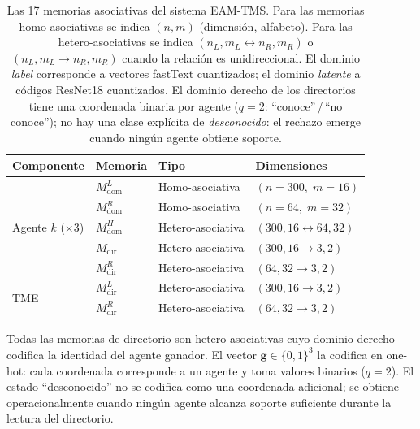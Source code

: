 \begin{table}[H]
\centering
\caption{Las 17 memorias asociativas del sistema EAM-TMS.
Para las memorias homo-asociativas se indica $(n, m)$ (dimensión, alfabeto).
Para las hetero-asociativas se indica $(n_L, m_L \leftrightarrow n_R, m_R)$ o
$(n_L, m_L \to n_R, m_R)$ cuando la relación es unidireccional.
El dominio \emph{label} corresponde a vectores fastText cuantizados;
el dominio \emph{latente} a códigos ResNet18 cuantizados.
El dominio derecho de los directorios tiene una coordenada binaria por agente
($q{=}2$: ``conoce''\,/\,``no conoce''); no hay una clase explícita de
\emph{desconocido}: el rechazo emerge cuando ningún agente obtiene soporte.}
\label{tab:memorias}
\small
\begin{tabular}{@{}llll@{}}
\toprule
\textbf{Componente} & \textbf{Memoria} & \textbf{Tipo} & \textbf{Dimensiones} \\
\midrule
\multirow{5}{*}{Agente $k$ (×3)} &
  $M^L_{\mathrm{dom}}$ & Homo-asociativa & $(n{=}300,\; m{=}16)$ \\
& $M^R_{\mathrm{dom}}$ & Homo-asociativa & $(n{=}64,\; m{=}32)$ \\
& $M^H_{\mathrm{dom}}$ & Hetero-asociativa & $(300, 16 \leftrightarrow 64, 32)$ \\
& $M_{\mathrm{dir}}$   & Hetero-asociativa & $(300, 16 \to 3, 2)$ \\
& $M^R_{\mathrm{dir}}$ & Hetero-asociativa & $(64, 32 \to 3, 2)$ \\
\midrule
\multirow{2}{*}{TME} &
  $M^L_{\mathrm{dir}}$ & Hetero-asociativa & $(300, 16 \to 3, 2)$ \\
& $M^R_{\mathrm{dir}}$ & Hetero-asociativa & $(64, 32 \to 3, 2)$ \\
\bottomrule
\end{tabular}
\end{table}

Todas las memorias de directorio son hetero-asociativas cuyo dominio derecho codifica la
identidad del agente ganador.
El vector $\mathbf{g} \in \{0,1\}^{3}$ la codifica en one-hot: cada coordenada corresponde
a un agente y toma valores binarios ($q{=}2$).
El estado ``desconocido'' no se codifica como una coordenada adicional; se obtiene
operacionalmente cuando ningún agente alcanza soporte suficiente durante la lectura del
directorio.

